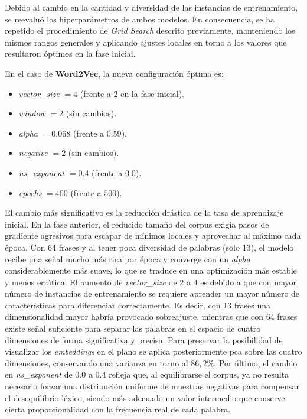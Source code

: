 Debido al cambio en la cantidad y diversidad de las instancias de entrenamiento, se reevaluó los hiperparámetros de ambos modelos. En consecuencia, se ha repetido el procedimiento de \textit{Grid Search} descrito previamente, manteniendo los mismos rangos generales y aplicando ajustes locales en torno a los valores que resultaron óptimos en la fase inicial.

En el caso de \textbf{Word2Vec}, la nueva configuración óptima es:

\begin{itemize}
  \item \textit{vector\_size} $= 4$ (frente a $2$ en la fase inicial).
  \item \textit{window} $= 2$ (sin cambios).
  \item \textit{alpha} $= 0.068$ (frente a $0.59$).
  \item \textit{negative} $= 2$ (sin cambios).
  \item \textit{ns\_exponent} $= 0.4$ (frente a $0.0$).
  \item \textit{epochs} $= 400$ (frente a $500$).
\end{itemize}

El cambio más significativo es la reducción drástica de la tasa de aprendizaje inicial. En la fase anterior, el reducido tamaño del corpus exigía pasos de gradiente agresivos para escapar de mínimos locales y aprovechar al máximo cada época. Con 64 frases y al tener poca diversidad de palabras (solo 13), el modelo recibe una señal mucho más rica por época y converge con un \textit{alpha} considerablemente más suave, lo que se traduce en una optimización más estable y menos errática. El aumento de \textit{vector\_size} de $2$ a $4$ es debido a que con mayor número de instancias de entrenamiento se requiere aprender un mayor número de características para diferenciar correctamente. Es decir, con 13 frases una dimensionalidad mayor habría provocado sobreajuste, mientras que con 64 frases existe señal suficiente para separar las palabras en el espacio de cuatro dimensiones de forma significativa y precisa. Para preservar la posibilidad de visualizar los \textit{embeddings} en el plano se aplica posteriormente \gls{pca} sobre las cuatro dimensiones, conservando una varianza en torno al $86,2\%$. Por último, el cambio en \textit{ns\_exponent} de $0.0$ a $0.4$ refleja que, al equilibrarse el corpus, ya no resulta necesario forzar una distribución uniforme de muestras negativas para compensar el desequilibrio léxico, siendo más adecuado un valor intermedio que conserve cierta proporcionalidad con la frecuencia real de cada palabra.

